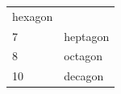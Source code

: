 \begin{table}[H]
{\begin{center}
\begin{xtabular*}{\mytablewidth}[t]{|p{10\mystarwidth}|p{10\mystarwidth}|}
        hexagon%
     \tabularnewline{}
    
    
        7 &
    
    
        heptagon%
     \tabularnewline{}
    
    
        8 &
    
    
        octagon%
     \tabularnewline{}
    
    
        10 &
    
    
        decagon%
     \tabularnewline{}
    
    

\end{xtabular*}
\end{center}}
\end{table}
